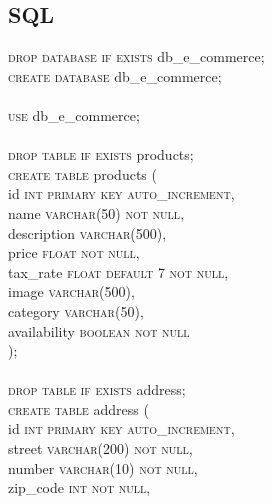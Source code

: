 \documentclass{article}
\begin{document}
\subsection{SQL}
\textsc{\textcolor{sentence}{drop database if exists}} db\_e\_commerce;\\
\textsc{\textcolor{sentence}{create database}} db\_e\_commerce;\\\\
\textsc{\textcolor{sentence}{use}} db\_e\_commerce;\\\\
\textsc{\textcolor{sentence}{drop table if exists}} products;\\
\textsc{\textcolor{sentence}{create table}} products (\\
\phantom{abc} id \textsc{\textcolor{sentence}{int primary key auto\_increment}},\\
\phantom{abc} name \textsc{\textcolor{sentence}{varchar\textcolor{numberSQL}{(50)} not null}},\\
\phantom{abc} description \textsc{\textcolor{sentence}{varchar\textcolor{numberSQL}{(500)}}},\\
\phantom{abc} price \textsc{\textcolor{sentence}{float not null}},\\
 \phantom{abc} tax\_rate \textsc{\textcolor{sentence}{float default \textcolor{numberSQL}{7} not null}},\\
\phantom{abc} image \textsc{\textcolor{sentence}{varchar\textcolor{numberSQL}{(500)}}},\\
\phantom{abc} category \textsc{\textcolor{sentence}{varchar\textcolor{numberSQL}{(50)}}},\\
 \phantom{abc} availability \textsc{\textcolor{sentence}{boolean not null}}\\);\\\\
 \textsc{\textcolor{sentence}{drop table if exists}} address;\\
 \textsc{\textcolor{sentence}{create table}} address (\\
  \phantom{abc} id \textsc{\textcolor{sentence}{int primary key auto\_increment}},\\
   \phantom{abc} street \textsc{\textcolor{sentence}{varchar\textcolor{numberSQL}{(200)}  not null}},\\
   \phantom{abc} number \textsc{\textcolor{sentence}{varchar\textcolor{numberSQL}{(10)}  not null}},\\
   \phantom{abc} zip\_code \textsc{\textcolor{sentence}{int not null}},\\
\end{document}
